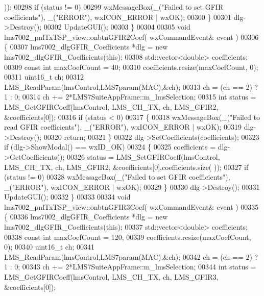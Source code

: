 \begin{DoxyCode}
{{{{{{      ));
00298         \textcolor{keywordflow}{if} (status != 0)
00299             wxMessageBox(\_(\textcolor{stringliteral}{"Failed to set GFIR coefficients"}), \_(\textcolor{stringliteral}{"ERROR"}), wxICON\_ERROR | wxOK);
00300     \}
00301     dlg->Destroy();
00302     UpdateGUI();
00303 \}
00304 
00305 \textcolor{keywordtype}{void} lms7002_pnlTxTSP_view::onbtnGFIR2Coef( wxCommandEvent& event )
00306 \{
00307     lms7002_dlgGFIR_Coefficients *dlg = \textcolor{keyword}{new} lms7002_dlgGFIR_Coefficients(\textcolor{keyword}{this});
00308     std::vector<double> coefficients;
00309     \textcolor{keyword}{const} \textcolor{keywordtype}{int} maxCoefCount = 40;
00310     coefficients.resize(maxCoefCount, 0);
00311     uint16\_t ch;
00312     LMS_ReadParam(lmsControl,LMS7param(MAC),&ch);
00313     ch = (ch == 2) ? 1 : 0;
00314     ch += 2*LMS7SuiteAppFrame::m_lmsSelection;
00315     \textcolor{keywordtype}{int} status =  LMS_GetGFIRCoeff(lmsControl, LMS_CH_TX, ch, LMS_GFIR2, &coefficients[0]);
00316     \textcolor{keywordflow}{if} (status < 0)
00317     \{
00318         wxMessageBox(\_(\textcolor{stringliteral}{"Failed to read GFIR coefficients"}), \_(\textcolor{stringliteral}{"ERROR"}), wxICON\_ERROR | wxOK);
00319         dlg->Destroy();
00320         \textcolor{keywordflow}{return};
00321     \}
00322     dlg->SetCoefficients(coefficients);
00323     \textcolor{keywordflow}{if} (dlg->ShowModal() == wxID\_OK)
00324     \{
00325         coefficients = dlg->GetCoefficients();
00326         status = LMS_SetGFIRCoeff(lmsControl, LMS_CH_TX, ch, LMS_GFIR2, &coefficients[0],coefficients.size(
      ));
00327         \textcolor{keywordflow}{if} (status != 0)
00328             wxMessageBox(\_(\textcolor{stringliteral}{"Failed to set GFIR coefficients"}), \_(\textcolor{stringliteral}{"ERROR"}), wxICON\_ERROR | wxOK);
00329     \}
00330     dlg->Destroy();
00331     UpdateGUI();
00332 \}
00333 
00334 \textcolor{keywordtype}{void} lms7002_pnlTxTSP_view::onbtnGFIR3Coef( wxCommandEvent& event )
00335 \{
00336     lms7002_dlgGFIR_Coefficients *dlg = \textcolor{keyword}{new} lms7002_dlgGFIR_Coefficients(\textcolor{keyword}{this});
00337     std::vector<double> coefficients;
00338     \textcolor{keyword}{const} \textcolor{keywordtype}{int} maxCoefCount = 120;
00339     coefficients.resize(maxCoefCount, 0);
00340     uint16\_t ch;
00341     LMS_ReadParam(lmsControl,LMS7param(MAC),&ch);
00342     ch = (ch == 2) ? 1 : 0;
00343     ch += 2*LMS7SuiteAppFrame::m_lmsSelection;
00344     \textcolor{keywordtype}{int} status =  LMS_GetGFIRCoeff(lmsControl, LMS_CH_TX, ch, LMS_GFIR3, &coefficients[0]);
}}}}}}
\end{DoxyCode}

